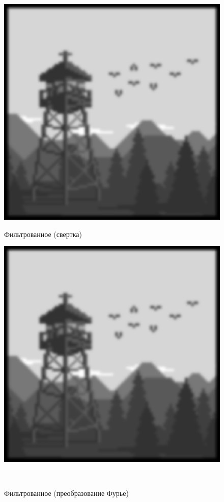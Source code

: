 \documentclass[a4paper]{article}
\begin{document}
\begin{figure}[H]
    \begin{minipage}{0.49\textwidth}
        \centering \includegraphics[width=\textwidth]{2/19_img_gaussian_by_conv2.png}
        \caption{Фильтрованное (свертка)}
    \end{minipage}\hfill
    \begin{minipage}{0.49\textwidth}
        \centering \includegraphics[width=\textwidth]{2/19_img_gaussian_by_fourier.png}
        \caption{Фильтрованное (преобразование Фурье)}
    \end{minipage}\\[1em]
\end{figure}\noindent
\end{document}
